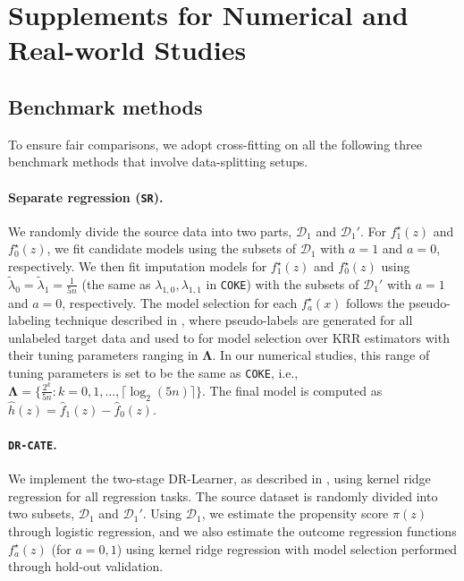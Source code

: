 \documentclass[12pt,a4paper,pdftex,onepage]{article}
\begin{document}
\section{Supplements for Numerical and Real-world Studies}\label{sec:app:numerical}

\subsection{Benchmark methods}\label{sec:app:bench}

To ensure fair comparisons, we adopt cross-fitting on all the following three benchmark methods that involve data-splitting setups. 

\paragraph{Separate regression (\texttt{SR}).} We randomly divide the source data into two parts, $\mathcal{D}_1$ and $\mathcal{D}_1'$. For $f_1^\star(z)$ and $f_0^\star(z)$, we fit candidate models using the subsets of $\mathcal{D}_1$ with $a = 1$ and $a = 0$, respectively. We then fit imputation models for $f_1^\star(z)$ and $f_0^\star(z)$ using $\widetilde\lambda_0= \widetilde\lambda_1= \frac{1}{5n}$ (the same as $\lambda_{1,0},\lambda_{1,1}$ in \texttt{COKE}) with the subsets of $\mathcal{D}_1'$ with $a = 1$ and $a = 0$, respectively. The model selection for each $f_a^\star(x)$ follows the pseudo-labeling technique described in \cite{wang2023pseudo}, where pseudo-labels are generated for all unlabeled target data and used to for model selection over KRR estimators with their tuning parameters ranging in ${\bm \Lambda}$. In our numerical studies, this range of tuning parameters is set to be the same as \texttt{COKE}, i.e., ${\bm \Lambda} = \{\frac{2^k}{5n} : k = 0, 1, \ldots, \lceil\log_2(5n)\rceil\}$. The final model is computed as $\hat h(z) = \hat f_1(z) - \hat f_0(z)$.

\paragraph{\texttt{DR-CATE}.} We implement the two-stage DR-Learner, as described in \cite{kennedy2020towards}, using kernel ridge regression for all regression tasks. The source dataset is randomly divided into two subsets, $\mathcal{D}_1$ and $\mathcal{D}_1'$. Using $\mathcal{D}_1$, we estimate the propensity score $\pi(z)$ through logistic regression, and we also estimate the outcome regression functions $f_a^\star(z)$ (for $a = 0, 1$) using kernel ridge regression with model selection performed through hold-out validation.
\end{document}
